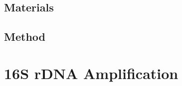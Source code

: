 \documentclass{article}
\begin{document}
\subsection{Materials}

\subsection{Method}

\section{16S rDNA Amplification}\label{1rA}






\end{document}
